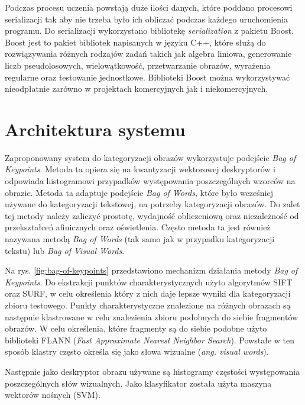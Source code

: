 Podczas procesu uczenia powstają duże ilości danych, które poddano procesowi serializacji tak aby nie trzeba było ich obliczać podczas każdego uruchomienia programu. Do serializacji wykorzystano bibliotekę \emph{serialization} z pakietu Boost. Boost jest to pakiet bibliotek napisanych w języku C++, które służą do rozwiązywania różnych rodzajów zadań takich jak algebra liniowa, generowanie liczb pseudolosowych, wielowątkowość, przetwarzanie obrazów, wyrażenia regularne oraz testowanie jednostkowe. Biblioteki Boost można wykorzystywać nieodpłatnie zarówno w projektach komercyjnych jak i niekomercyjnych.\cite{BOOST} 

\section{Architektura systemu}
Zaproponowany system do kategoryzacji obrazów wykorzystuje podejście \emph{Bag of Keypoints}\cite{CSURKA04}. Metoda ta opiera się na kwantyzacji wektorowej deskryptorów i odpowiada histogramowi przypadków występowania poszczególnych wzorców na obrazie. Metoda ta adaptuje podejście \emph{Bag of Words}, które było wcześniej używane do kategoryzacji tekstowej\cite{TONG00}, na potrzeby kategoryzacji obrazów. Do zalet tej metody należy zaliczyć prostotę, wydajność obliczeniową oraz niezależność od przekształceń afinicznych oraz oświetlenia.\cite{CSURKA04} Często metoda ta jest również nazywana metodą \emph{Bag of Words}\cite{TENG11} (tak samo jak w przypadku kategoryzacji tekstu) lub \emph{Bag of Visual Words}\cite{KESORN12}.

Na rys. \ref{fig:bag-of-keypoints} przedstawiono mechanizm działania metody \emph{Bag of Keypoints}. Do ekstrakcji punktów charakterystycznych użyto algorytmów SIFT oraz SURF, w celu określenia który z nich daje lepsze wyniki dla kategoryzacji zbioru testowego. Punkty charakterystyczne znalezione na różnych obrazach są następnie klastrowane w celu znalezienia zbioru podobnych do siebie fragmentów obrazów. W celu określenia, które fragmenty są do siebie podobne użyto biblioteki FLANN (\emph{Fast Approximate Nearest Neighbor Search}). Powstałe w ten sposób klastry często określa się jako słowa wizualne (\emph{ang. visual words}).

Następnie jako deskryptor obrazu używane są histogramy częstości występowania poszczególnych słów wizualnych. Jako klasyfikator została użyta maszyna wektorów nośnych (SVM).

